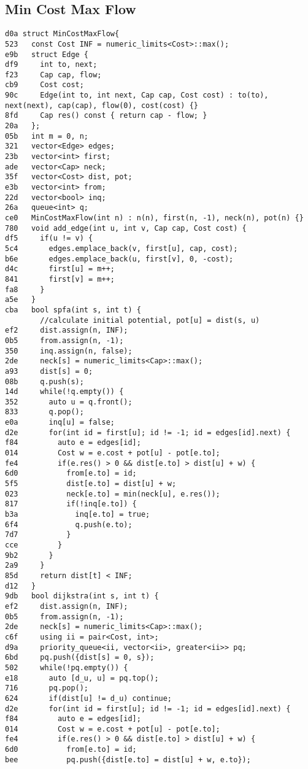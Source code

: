 \documentclass[10pt, a4paper, twoside]{article}
\begin{document}
\subsection{Min Cost Max Flow}
\begin{lstlisting}
d0a struct MinCostMaxFlow{
523   const Cost INF = numeric_limits<Cost>::max();
e9b   struct Edge {
df9     int to, next;
f23     Cap cap, flow;
cb9     Cost cost;
90c     Edge(int to, int next, Cap cap, Cost cost) : to(to), next(next), cap(cap), flow(0), cost(cost) {}
8fd     Cap res() const { return cap - flow; }
20a   };
05b   int m = 0, n;
321   vector<Edge> edges;
23b   vector<int> first;
ade   vector<Cap> neck;
35f   vector<Cost> dist, pot;
e3b   vector<int> from;
22d   vector<bool> inq;
26a   queue<int> q;
ce0   MinCostMaxFlow(int n) : n(n), first(n, -1), neck(n), pot(n) {}
780   void add_edge(int u, int v, Cap cap, Cost cost) {
df5     if(u != v) {
5c4       edges.emplace_back(v, first[u], cap, cost);
b6e       edges.emplace_back(u, first[v], 0, -cost);
d4c       first[u] = m++;
841       first[v] = m++;
fa8     }	
a5e   }
cba   bool spfa(int s, int t) {
        //calculate initial potential, pot[u] = dist(s, u)
ef2     dist.assign(n, INF);
0b5     from.assign(n, -1);
350     inq.assign(n, false);
2de     neck[s] = numeric_limits<Cap>::max();
a93     dist[s] = 0;
08b     q.push(s);
14d     while(!q.empty()) {
352       auto u = q.front();
833       q.pop();
e0a       inq[u] = false;
d2e       for(int id = first[u]; id != -1; id = edges[id].next) {
f84         auto e = edges[id];
014         Cost w = e.cost + pot[u] - pot[e.to];
fe4         if(e.res() > 0 && dist[e.to] > dist[u] + w) {
6d0           from[e.to] = id;
5f5           dist[e.to] = dist[u] + w;
023           neck[e.to] = min(neck[u], e.res());
817           if(!inq[e.to]) {
b3a             inq[e.to] = true;
6f4             q.push(e.to);
7d7           }
cce         }
9b2       }
2a9     }
85d     return dist[t] < INF;
d12   }
9db   bool dijkstra(int s, int t) {
ef2     dist.assign(n, INF);
0b5     from.assign(n, -1);
2de     neck[s] = numeric_limits<Cap>::max();
c6f     using ii = pair<Cost, int>;
d9a     priority_queue<ii, vector<ii>, greater<ii>> pq;
6bd     pq.push({dist[s] = 0, s});
502     while(!pq.empty()) {
e18       auto [d_u, u] = pq.top();
716       pq.pop();
624       if(dist[u] != d_u) continue;
d2e       for(int id = first[u]; id != -1; id = edges[id].next) {
f84         auto e = edges[id];
014         Cost w = e.cost + pot[u] - pot[e.to];
fe4         if(e.res() > 0 && dist[e.to] > dist[u] + w) {
6d0           from[e.to] = id;
bee           pq.push({dist[e.to] = dist[u] + w, e.to});

\end{lstlisting}
\end{document}
